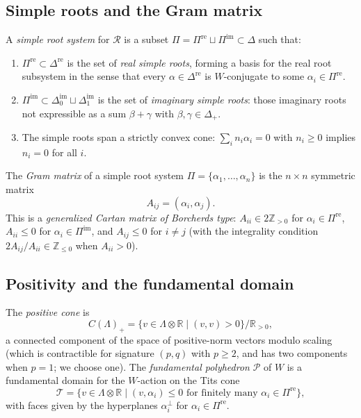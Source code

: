 \subsection{Simple roots and the Gram matrix}
\label{ssec:simple-roots-gram}

\begin{definition}
\label{def:simple-roots}
A \emph{simple root system} for $\mathcal{R}$ is a subset $\Pi = \Pi^{\mathrm{re}} \sqcup \Pi^{\mathrm{im}} \subset \Delta$ such that:
\begin{enumerate}[label=(\alph*)]
 \item $\Pi^{\mathrm{re}} \subset \Delta^{\mathrm{re}}$ is the set of \emph{real simple roots}, forming a basis for the real root subsystem in the sense that every $\alpha \in \Delta^{\mathrm{re}}$ is $W$-conjugate to some $\alpha_i \in \Pi^{\mathrm{re}}$.
 \item $\Pi^{\mathrm{im}} \subset \Delta^{\mathrm{im}}_0 \sqcup \Delta^{\mathrm{im}}_1$ is the set of \emph{imaginary simple roots}: those imaginary roots not expressible as a sum $\beta + \gamma$ with $\beta, \gamma \in \Delta_+$.
 \item The simple roots span a strictly convex cone: $\sum_i n_i \alpha_i = 0$ with $n_i \geq 0$ implies $n_i = 0$ for all $i$.
\end{enumerate}
\end{definition}

\begin{definition}
\label{def:gram-matrix}
The \emph{Gram matrix} of a simple root system $\Pi = \{\alpha_1, \ldots, \alpha_n\}$ is the $n \times n$ symmetric matrix
\[
 A_{ij} = (\alpha_i, \alpha_j).
\]
This is a \emph{generalized Cartan matrix of Borcherds type}: $A_{ii} \in 2\mathbb{Z}_{>0}$ for $\alpha_i \in \Pi^{\mathrm{re}}$, $A_{ii} \leq 0$ for $\alpha_i \in \Pi^{\mathrm{im}}$, and $A_{ij} \leq 0$ for $i \neq j$ (with the integrality condition $2A_{ij}/A_{ii} \in \mathbb{Z}_{\leq 0}$ when $A_{ii} > 0$).
\end{definition}

\subsection{Positivity and the fundamental domain}
\label{ssec:positivity}

\begin{definition}
\label{def:positive-cone}
The \emph{positive cone} is
\[
 C(\Lambda)_+ = \{v \in \Lambda \otimes \mathbb{R} \mid (v, v) > 0\} / \mathbb{R}_{>0},
\]
a connected component of the space of positive-norm vectors modulo scaling (which is contractible for signature $(p,q)$ with $p \geq 2$, and has two components when $p = 1$; we choose one). The \emph{fundamental polyhedron} $\mathcal{P}$ of $W$ is a fundamental domain for the $W$-action on the Tits cone
\[
 \mathcal{T} = \{v \in \Lambda \otimes \mathbb{R} \mid (v, \alpha_i) \leq 0 \text{ for finitely many } \alpha_i \in \Pi^{\mathrm{re}}\},
\]
with faces given by the hyperplanes $\alpha_i^\perp$ for $\alpha_i \in \Pi^{\mathrm{re}}$.
\end{definition}

